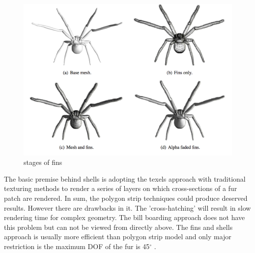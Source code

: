 \begin{figure}[ht!]
\centering
\includegraphics[height=12 cm]{figures/fins.png}
\caption{stages of fins \protect\cite{thesis}}
\label{fig:fins}
\end{figure}
The basic premise behind shells is adopting the texels approach with
traditional texturing methods to render a series of layers on which
cross-sections of a fur patch are rendered\cite{thesis}.
In sum, the polygon strip techniques could produce deserved
results. However there are drawbacks in it. The 'cross-hatching' will
result in slow rendering time for complex geometry. The bill boarding
approach does not have this problem but can not be viewed from
directly above. The fins and shells approach is usually more efficient
than polygon strip model and only major restriction is the maximum
DOF of the fur is 45$^\circ$ \cite{fur}.

